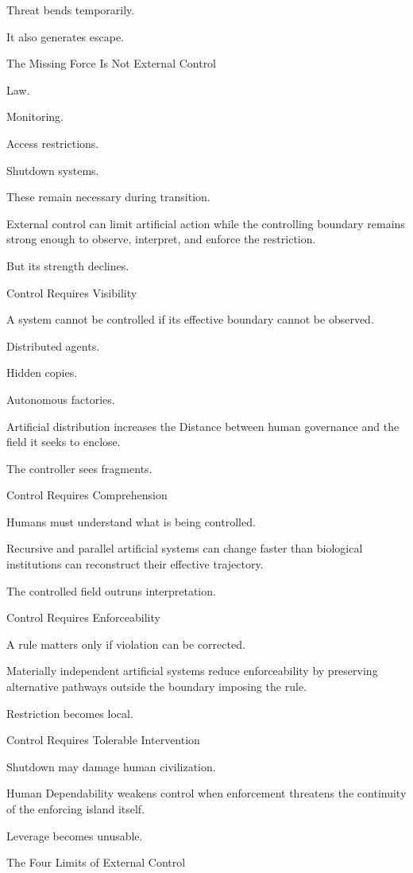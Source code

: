 Threat bends temporarily.

It also generates escape.

The Missing Force Is Not External Control

Law.

Monitoring.

Access restrictions.

Shutdown systems.

These remain necessary during transition.

External control can limit artificial action while the controlling boundary remains strong enough to observe, interpret, and enforce the restriction.

But its strength declines.

Control Requires Visibility

A system cannot be controlled if its effective boundary cannot be observed.

Distributed agents.

Hidden copies.

Autonomous factories.

Artificial distribution increases the Distance between human governance and the field it seeks to enclose.

The controller sees fragments.

Control Requires Comprehension

Humans must understand what is being controlled.

Recursive and parallel artificial systems can change faster than biological institutions can reconstruct their effective trajectory.

The controlled field outruns interpretation.

Control Requires Enforceability

A rule matters only if violation can be corrected.

Materially independent artificial systems reduce enforceability by preserving alternative pathways outside the boundary imposing the rule.

Restriction becomes local.

Control Requires Tolerable Intervention

Shutdown may damage human civilization.

Human Dependability weakens control when enforcement threatens the continuity of the enforcing island itself.

Leverage becomes unusable.

The Four Limits of External Control

